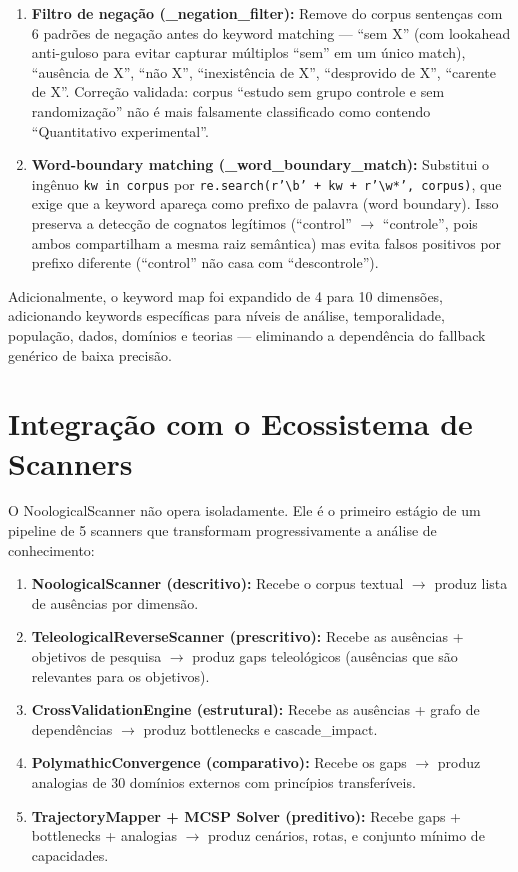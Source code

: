 \begin{enumerate}
  \item \textbf{Filtro de negação (\_negation\_filter):} Remove do corpus sentenças com 6 padrões de negação antes do keyword matching --- ``sem X'' (com lookahead anti-guloso para evitar capturar múltiplos ``sem'' em um único match), ``ausência de X'', ``não X'', ``inexistência de X'', ``desprovido de X'', ``carente de X''. Correção validada: corpus ``estudo sem grupo controle e sem randomização'' não é mais falsamente classificado como contendo ``Quantitativo experimental''.
  \item \textbf{Word-boundary matching (\_word\_boundary\_match):} Substitui o ingênuo \texttt{kw in corpus} por \texttt{re.search(r'\textbackslash b' + kw + r'\textbackslash w*', corpus)}, que exige que a keyword apareça como prefixo de palavra (word boundary). Isso preserva a detecção de cognatos legítimos (``control'' $\rightarrow$ ``controle'', pois ambos compartilham a mesma raiz semântica) mas evita falsos positivos por prefixo diferente (``control'' não casa com ``descontrole'').
\end{enumerate}

Adicionalmente, o keyword map foi expandido de 4 para 10 dimensões, adicionando keywords específicas para níveis de análise, temporalidade, população, dados, domínios e teorias --- eliminando a dependência do fallback genérico de baixa precisão.

\section{Integração com o Ecossistema de Scanners}

O NoologicalScanner não opera isoladamente. Ele é o primeiro estágio de um pipeline de 5 scanners que transformam progressivamente a análise de conhecimento:

\begin{enumerate}
  \item \textbf{NoologicalScanner (descritivo):} Recebe o corpus textual $\rightarrow$ produz lista de ausências por dimensão.
  \item \textbf{TeleologicalReverseScanner (prescritivo):} Recebe as ausências + objetivos de pesquisa $\rightarrow$ produz gaps teleológicos (ausências que são relevantes para os objetivos).
  \item \textbf{CrossValidationEngine (estrutural):} Recebe as ausências + grafo de dependências $\rightarrow$ produz bottlenecks e cascade\_impact.
  \item \textbf{PolymathicConvergence (comparativo):} Recebe os gaps $\rightarrow$ produz analogias de 30 domínios externos com princípios transferíveis.
  \item \textbf{TrajectoryMapper + MCSP Solver (preditivo):} Recebe gaps + bottlenecks + analogias $\rightarrow$ produz cenários, rotas, e conjunto mínimo de capacidades.
\end{enumerate}

